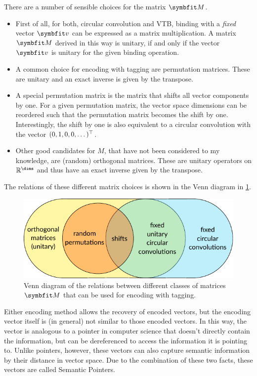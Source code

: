 There are a number of sensible choices for the matrix $\mat M$.
\begin{itemize}
    \item First of all, for both, circular convolution and VTB, binding with a \emph{fixed} vector $\vc v$ can be expressed as a matrix multiplication.
        A matrix $\mat M$ derived in this way is unitary, if and only if the vector $\vc v$ is unitary for the given binding operation.
    \item A common choice for encoding with tagging are permutation matrices.
        These are unitary and an exact inverse is given by the transpose.
    \item A special permutation matrix is the matrix that shifts all vector components by one.
        For a given permutation matrix, the vector space dimensions can be reordered such that the permutation matrix becomes the shift by one.
        Interestingly, the shift by one is also equivalent to a circular convolution with the vector $(0, 1, 0, 0, \dotsc)^{\top}$.
    \item Other good candidates for $M$, that have not been considered to my knowledge, are (random) orthogonal matrices.
        These are unitary operators on $\mathbb{R}^{\dims}$ and thus have an exact inverse given by the transpose.
\end{itemize}
The relations of these different matrix choices is shown in the Venn diagram in \cref{fig:tagging-matrices}.
\begin{figure}
    \centering
    \includegraphics{figures/tagging-matrices}
    \caption[Venn diagram of matrices for encoding with tagging]{Venn diagram of the relations between different classes of matrices $\mat M$ that can be used for encoding with tagging.}\label{fig:tagging-matrices}
\end{figure}

Either encoding method allows the recovery of encoded vectors, but the encoding vector itself is (in general) not similar to those encoded vectors.
In this way, the vector is analogous to a pointer in computer science that doesn't directly contain the information, but can be dereferenced to access the information it is pointing to.
Unlike pointers, however, these vectors can also capture semantic information by their distance in vector space.
Due to the combination of these two facts, these vectors are called Semantic Pointers. 


